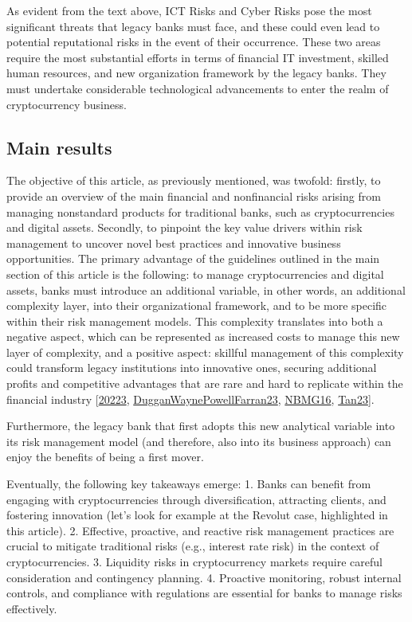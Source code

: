\documentclass[letterpaper,10pt,english]{jupyterBook}
\begin{document}
\sphinxAtStartPar
As evident from the text above, ICT Risks and Cyber Risks pose the most significant threats that legacy banks must face, and these could even lead to potential reputational risks in the event of their occurrence. These two areas require the most substantial efforts in terms of financial IT investment, skilled human resources, and new organization framework by the legacy banks. They must undertake considerable technological advancements to enter the realm of cryptocurrency business.






\subsection{Main results}
\label{\detokenize{ARM/arm:main-results}}
\sphinxAtStartPar
The objective of this article, as previously mentioned, was two\sphinxhyphen{}fold: firstly, to provide an overview of the main financial and non\sphinxhyphen{}financial risks arising from managing non\sphinxhyphen{}standard products for traditional banks, such as cryptocurrencies and digital assets. Secondly, to pinpoint the key value drivers within risk management to uncover novel best practices and innovative business opportunities. The primary advantage of the guidelines outlined in the main section of this article is the following: to manage cryptocurrencies and digital assets, banks must introduce an additional variable, in other words, an additional complexity layer, into their organizational framework, and to be more specific within their risk management models. This complexity translates into both a negative aspect, which can be represented as increased costs to manage this new layer of complexity, and a positive aspect: skillful management of this complexity could transform legacy institutions into innovative ones, securing additional profits and competitive advantages that are rare and hard to replicate within the financial industry {[}\hyperlink{cite.ARM/arm:id147}{20223}, \hyperlink{cite.ARM/arm:id146}{DugganWaynePowellFarran23}, \hyperlink{cite.ARM/arm:id144}{NBMG16}, \hyperlink{cite.ARM/arm:id149}{Tan23}{]}.

\sphinxAtStartPar
Furthermore, the legacy bank that first adopts this new analytical variable into its risk management model (and therefore, also into its business approach) can enjoy the benefits of being a first mover.

\sphinxAtStartPar
Eventually, the following key takeaways emerge:
1. Banks can benefit from engaging with cryptocurrencies through diversification, attracting clients, and fostering innovation (let’s look for example at the Revolut case, highlighted in this article).
2. Effective, proactive, and reactive risk management practices are crucial to mitigate traditional risks (e.g., interest rate risk) in the context of cryptocurrencies.
3. Liquidity risks in cryptocurrency markets require careful consideration and contingency planning.
4. Proactive monitoring, robust internal controls, and compliance with regulations are essential for banks to manage risks effectively.
\end{document}
